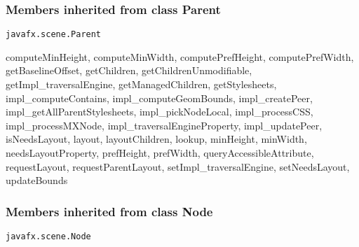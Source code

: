 {{{{{{{{{{{\subsubsection{Members inherited from class Parent }{
\texttt{javafx.scene.Parent} {\small 
{}}
{\small 

computeMinHeight, computeMinWidth, computePrefHeight, computePrefWidth, getBaselineOffset, getChildren, getChildrenUnmodifiable, getImpl\_traversalEngine, getManagedChildren, getStylesheets, impl\_computeContains, impl\_computeGeomBounds, impl\_createPeer, impl\_getAllParentStylesheets, impl\_pickNodeLocal, impl\_processCSS, impl\_processMXNode, impl\_traversalEngineProperty, impl\_updatePeer, isNeedsLayout, layout, layoutChildren, lookup, minHeight, minWidth, needsLayoutProperty, prefHeight, prefWidth, queryAccessibleAttribute, requestLayout, requestParentLayout, setImpl\_traversalEngine, setNeedsLayout, updateBounds}
\subsubsection{Members inherited from class Node }{
\texttt{javafx.scene.Node} {\small 
{}}
{\small 

}}}}}}}}}}}}}}
